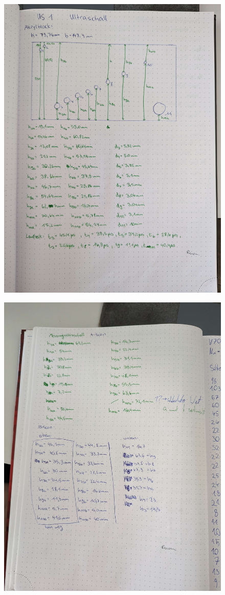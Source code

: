 \begin{figure}
    \centering
    \includegraphics[width=\textwidth]{US1_Ultraschall/img/Messdaten1.jpg}
\end{figure}

\begin{figure}
    \centering
    \includegraphics[width=\textwidth]{US1_Ultraschall/img/Messdaten2.jpg}
\end{figure}